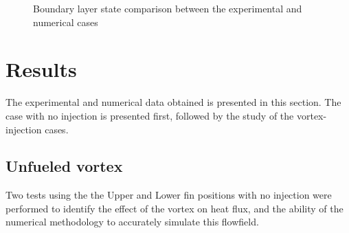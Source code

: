 \documentclass{AIAA}
\begin{document}
\begin{figure}[!h]
\center
{}
\caption{Boundary layer state comparison between the experimental and numerical cases}
\label{fig:Num_Exp_BLcompar}
\end{figure} 



\section{Results}

The experimental and numerical data obtained is presented in this section.
The case with no injection is presented first, followed by the study of the vortex-injection cases.

\subsection{Unfueled vortex}

Two tests using the the Upper and Lower fin positions with no injection were performed to identify the effect of the vortex on heat flux, and the ability of the numerical methodology to accurately simulate this flowfield.
\end{document}
